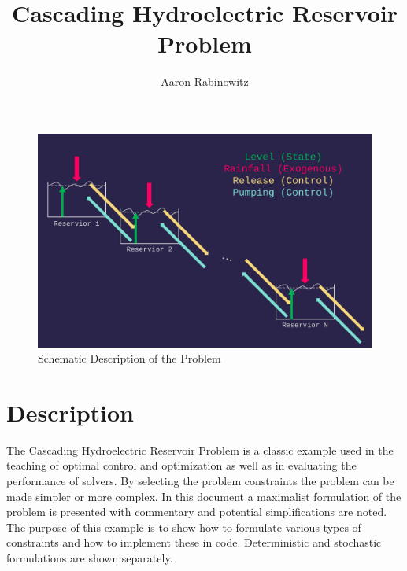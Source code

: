 \documentclass[12pt]{article}
\title{Cascading Hydroelectric Reservoir Problem}
\author{Aaron Rabinowitz}
\date{}
\begin{document}
\maketitle

\begin{figure}[H]
	\centering
	\includegraphics[width=\linewidth]{figs/Schematic.png}
	\caption{Schematic Description of the Problem}
	\label{fig:schematic}
\end{figure}

\section*{Description}

The Cascading Hydroelectric Reservoir Problem is a classic example used in the teaching of optimal control and optimization as well as in evaluating the performance of solvers. By selecting the problem constraints the problem can be made simpler or more complex. In this document a maximalist formulation of the problem is presented with commentary and potential simplifications are noted. The purpose of this example is to show how to formulate various types of constraints and how to implement these in code. Deterministic and stochastic formulations are shown separately.
\end{document}
